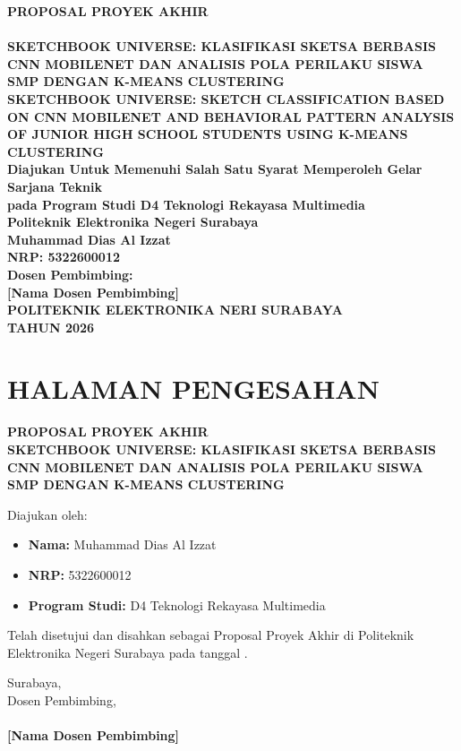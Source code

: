 \documentclass[12pt,a4paper,oneside,openany]{report}
\begin{document}
\begin{titlepage}
\thispagestyle{empty}
\begin{center}
\textbf{PROPOSAL PROYEK AKHIR}\\[1cm]
\textbf{}\\[0.5cm]
\textbf{SKETCHBOOK UNIVERSE: KLASIFIKASI SKETSA BERBASIS CNN MOBILENET DAN ANALISIS POLA PERILAKU SISWA SMP DENGAN K-MEANS CLUSTERING}\\[0.5cm]
\textbf{SKETCHBOOK UNIVERSE: SKETCH CLASSIFICATION BASED ON CNN MOBILENET AND BEHAVIORAL PATTERN ANALYSIS OF JUNIOR HIGH SCHOOL STUDENTS USING K-MEANS CLUSTERING}\\[2cm]
\textbf{Diajukan Untuk Memenuhi Salah Satu Syarat Memperoleh Gelar Sarjana Teknik}\\[0.5cm]
\textbf{pada Program Studi D4 Teknologi Rekayasa Multimedia}\\[0.5cm]
\textbf{Politeknik Elektronika Negeri Surabaya}\\[2cm]
\textbf{Muhammad Dias Al Izzat}\\[0.3cm]
\textbf{NRP: 5322600012}\\[2cm]
\textbf{Dosen Pembimbing:}\\[0.3cm]
\textbf{[Nama Dosen Pembimbing]}\\[2cm]
\textbf{POLITEKNIK ELEKTRONIKA NERI SURABAYA}\\[0.3cm]
\textbf{TAHUN 2026}
\end{center}
\end{titlepage}

\chapter*{HALAMAN PENGESAHAN}
\thispagestyle{empty}
\begin{center}
\textbf{PROPOSAL PROYEK AKHIR}\\[0.5cm]
\textbf{SKETCHBOOK UNIVERSE: KLASIFIKASI SKETSA BERBASIS CNN MOBILENET DAN ANALISIS POLA PERILAKU SISWA SMP DENGAN K-MEANS CLUSTERING}\\[1cm]
\end{center}
Diajukan oleh:
\begin{itemize}
\item \textbf{Nama:} Muhammad Dias Al Izzat
\item \textbf{NRP:} 5322600012
\item \textbf{Program Studi:} D4 Teknologi Rekayasa Multimedia
\end{itemize}
Telah disetujui dan disahkan sebagai Proposal Proyek Akhir di Politeknik Elektronika Negeri Surabaya pada tanggal \underline{\hspace{2cm}}.
\vspace{1cm}
\begin{flushright}
Surabaya, \underline{\hspace{3cm}}\\[1cm]
Dosen Pembimbing,\\[2cm]
\underline{\hspace{5cm}}\\[0.3cm]
\textbf{[Nama Dosen Pembimbing]}
\end{flushright}
\newpage
\end{document}
